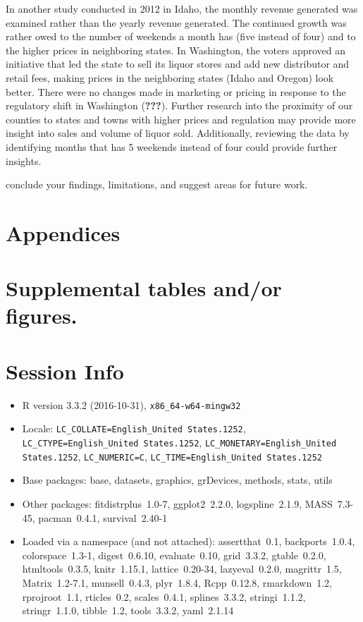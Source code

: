 \documentclass[]{elsarticle} %
\begin{document}
In another study conducted in 2012 in Idaho, the monthly revenue
generated was examined rather than the yearly revenue generated. The
continued growth was rather owed to the number of weekends a month has
(five instead of four) and to the higher prices in neighboring states.
In Washington, the voters approved an initiative that led the state to
sell its liquor stores and add new distributor and retail fees, making
prices in the neighboring states (Idaho and Oregon) look better. There
were no changes made in marketing or pricing in response to the
regulatory shift in Washington ({\textbf{???}}). Further research into
the proximity of our counties to states and towns with higher prices and
regulation may provide more insight into sales and volume of liquor
sold. Additionally, reviewing the data by identifying months that has 5
weekends instead of four could provide further insights.

conclude your findings, limitations, and suggest areas for future work.

\newpage

\section{Appendices}\label{appendices}

\section{Supplemental tables and/or
figures.}\label{supplemental-tables-andor-figures.}

\section{Session Info}\label{session-info}

\begin{itemize}\raggedright
  \item R version 3.3.2 (2016-10-31), \verb|x86_64-w64-mingw32|
  \item Locale: \verb|LC_COLLATE=English_United States.1252|, \verb|LC_CTYPE=English_United States.1252|, \verb|LC_MONETARY=English_United States.1252|, \verb|LC_NUMERIC=C|, \verb|LC_TIME=English_United States.1252|
  \item Base packages: base, datasets, graphics, grDevices,
    methods, stats, utils
  \item Other packages: fitdistrplus~1.0-7, ggplot2~2.2.0,
    logspline~2.1.9, MASS~7.3-45, pacman~0.4.1, survival~2.40-1
  \item Loaded via a namespace (and not attached): assertthat~0.1,
    backports~1.0.4, colorspace~1.3-1, digest~0.6.10,
    evaluate~0.10, grid~3.3.2, gtable~0.2.0, htmltools~0.3.5,
    knitr~1.15.1, lattice~0.20-34, lazyeval~0.2.0, magrittr~1.5,
    Matrix~1.2-7.1, munsell~0.4.3, plyr~1.8.4, Rcpp~0.12.8,
    rmarkdown~1.2, rprojroot~1.1, rticles~0.2, scales~0.4.1,
    splines~3.3.2, stringi~1.1.2, stringr~1.1.0, tibble~1.2,
    tools~3.3.2, yaml~2.1.14
\end{itemize}
\end{document}
